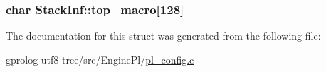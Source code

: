 \subsubsection[{\texorpdfstring{top\+\_\+macro}{top_macro}}]{\setlength{\rightskip}{0pt plus 5cm}char Stack\+Inf\+::top\+\_\+macro\mbox{[}128\mbox{]}}\hypertarget{structStackInf_aecd772924d9909d2875259c5aedc5bc9}{}\label{structStackInf_aecd772924d9909d2875259c5aedc5bc9}


The documentation for this struct was generated from the following file\+:\begin{DoxyCompactItemize}
\item 
gprolog-\/utf8-\/tree/src/\+Engine\+Pl/\hyperlink{pl__config_8c}{pl\+\_\+config.\+c}\end{DoxyCompactItemize}
